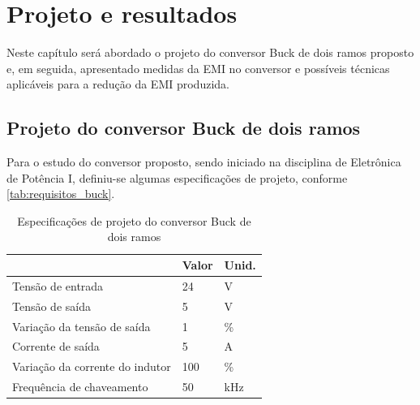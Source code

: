 
\chapter{Projeto e resultados}
\label{cap:resultados}

Neste capítulo será abordado o projeto do conversor Buck \interleaved de dois ramos proposto e, em seguida, apresentado medidas da EMI no conversor e possíveis técnicas aplicáveis para a redução da EMI produzida. 
    
    \section{Projeto do conversor Buck \Interleaved de dois ramos} \label{cap:result_proj}
    
    Para o estudo do conversor proposto, sendo iniciado na disciplina de Eletrônica de Potência I, definiu-se algumas especificações de projeto, conforme \autoref{tab:requisitos_buck}.
        
    \begin{table}[htbp]
        \centering
        \caption{Especificações de projeto do conversor Buck \Interleaved de dois ramos}
        \label{tab:requisitos_buck}
        \begin{tabular}{@{}|m{}|m{}|m{}|@{}}
            \hline
             & Valor & Unid. \\
            \hline
            Tensão de entrada               & 24    & \unit{\volt}      \\ \hline
            Tensão de saída                 & 5     & \unit{\volt}      \\ \hline
            Variação da tensão de saída     & 1     & \unit{\percent}    \\ \hline
            Corrente de saída               & 5     & \unit{\ampere}     \\ \hline
            Variação da corrente do indutor & 100   & \unit{\percent}    \\ \hline
            Frequência de chaveamento       & 50    & \unit{\kilo\hertz} \\ \hline
        \end{tabular}
    \end{table}
    
